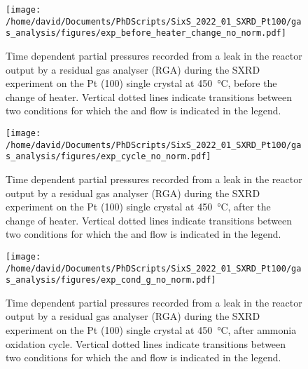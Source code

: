 \begin{figure}[!htb]
    \centering
    \texttt{[image: /home/david/Documents/PhDScripts/SixS\_2022\_01\_SXRD\_Pt100/gas\_analysis/figures/exp\_before\_heater\_change\_no\_norm.pdf]}
    \caption{
        Time dependent partial pressures recorded from a leak in the reactor output by a residual gas analyser (RGA) during the SXRD experiment on the Pt (100) single crystal at \qty{450}{\degreeCelsius}, before the change of heater.
        Vertical dotted lines indicate transitions between two conditions for which the  and  flow is indicated in the legend.
    }
    \label{fig:RGA450Pt100BeforeHeaterChange}
\end{figure}

\begin{figure}[!htb]
    \centering
    \texttt{[image: /home/david/Documents/PhDScripts/SixS\_2022\_01\_SXRD\_Pt100/gas\_analysis/figures/exp\_cycle\_no\_norm.pdf]}
    \caption{
        Time dependent partial pressures recorded from a leak in the reactor output by a residual gas analyser (RGA) during the SXRD experiment on the Pt (100) single crystal at \qty{450}{\degreeCelsius}, after the change of heater.
        Vertical dotted lines indicate transitions between two conditions for which the  and  flow is indicated in the legend.
    }
    \label{fig:RGA450Pt100Cycle}
\end{figure}

\begin{figure}[!htb]
    \centering
    \texttt{[image: /home/david/Documents/PhDScripts/SixS\_2022\_01\_SXRD\_Pt100/gas\_analysis/figures/exp\_cond\_g\_no\_norm.pdf]}
    \caption{
        Time dependent partial pressures recorded from a leak in the reactor output by a residual gas analyser (RGA) during the SXRD experiment on the Pt (100) single crystal at \qty{450}{\degreeCelsius}, after ammonia oxidation cycle.
        Vertical dotted lines indicate transitions between two conditions for which the  and  flow is indicated in the legend.
    }
    \label{fig:RGA450Pt100CondG}
\end{figure}